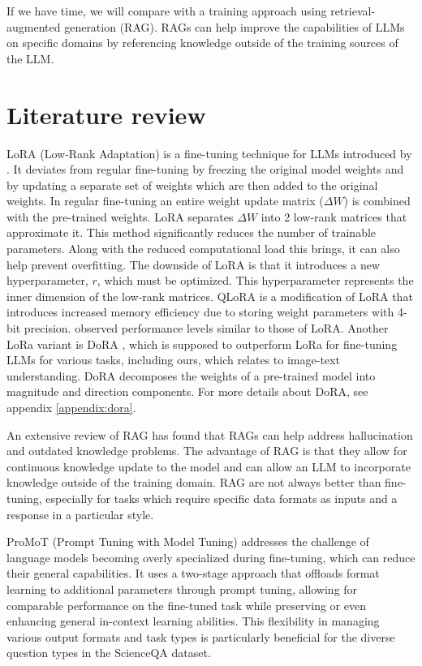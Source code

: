 \documentclass[11pt]{article} %
\begin{document}
If we have time, we will compare with a training approach using retrieval-augmented generation (RAG). RAGs can help improve the capabilities of LLMs on specific domains by referencing knowledge outside of the training sources of the LLM.

\section*{Literature review} 
LoRA (Low-Rank Adaptation) is a fine-tuning technique for LLMs introduced by \cite{lora}. It deviates from regular fine-tuning by freezing the original model weights and by updating a separate set of weights which are then added to the original weights. In regular fine-tuning an entire weight update matrix ($\Delta W$) is combined with the pre-trained weights. LoRA separates $\Delta W$ into 2 low-rank matrices that approximate it. This method significantly reduces the number of trainable parameters. Along with the reduced computational load this brings, it can also help prevent overfitting. The downside of LoRA is that it introduces a new hyperparameter, $r$, which must be optimized. This hyperparameter represents the inner dimension of the low-rank matrices. QLoRA \cite{qlora} is a modification of LoRA that introduces increased memory efficiency due to storing weight parameters with 4-bit precision. \cite{qlora} observed performance levels similar to those of LoRA.
Another LoRa variant is DoRA \cite{dora}, which is supposed to outperform LoRa for fine-tuning LLMs for various tasks, including ours, which relates to image-text understanding. DoRA decomposes the weights of a pre-trained model into magnitude and direction components. For more details about DoRA, see appendix \ref{appendix:dora}.

An extensive review of RAG \cite{ragreview} has found that RAGs can help address hallucination and outdated knowledge problems. The advantage of RAG is that they allow for continuous knowledge update to the model and can allow an LLM to incorporate knowledge outside of the training domain. RAG are not always better than fine-tuning, especially for tasks which require specific data formats as inputs and a response in a particular style.

ProMoT (Prompt Tuning with Model Tuning) \cite{valizadehaslani2022twostagefinetuningnovelstrategy} addresses the challenge of language models becoming overly specialized during fine-tuning, which can reduce their general capabilities. It uses a two-stage approach that offloads format learning to additional parameters through prompt tuning, allowing for comparable performance on the fine-tuned task while preserving or even enhancing general in-context learning abilities. This flexibility in managing various output formats and task types is particularly beneficial for the diverse question types in the ScienceQA dataset.
\end{document}
